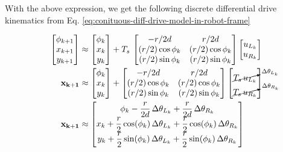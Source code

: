 \documentclass[12pt]{article}
\begin{document}
With the above expression, we get the following discrete differential drive kinematics from Eq. \ref{eq:conituous-diff-drive-model-in-robot-frame}

\renewcommand{\arraystretch}{1.5}
\begin{equation}
\begin{aligned}
    \begin{bmatrix}
        \phi_{k+1} \\ x_{k+1} \\ y_{k+1}
    \end{bmatrix} &\approx 
    \begin{bmatrix}
        \phi_k \\ x_k \\ y_k
    \end{bmatrix} + 
    T_s \, \begin{bmatrix}
        -r/2d & r/2d \\
        (r/2)\cos\phi_k & (r/2)\cos\phi_k \\
        (r/2)\sin\phi_k & (r/2)\sin\phi_k
    \end{bmatrix}  
    \begin{bmatrix} u_{L_k} \\ u_{R_k} \end{bmatrix} \\
    \mathbf{x_{k+1}} &\approx 
    \begin{bmatrix}
        \phi_k \\ x_k \\ y_k
    \end{bmatrix} + 
    \begin{bmatrix}
        -r/2d & r/2d \\
        (r/2)\cos\phi_k & (r/2)\cos\phi_k \\
        (r/2)\sin\phi_k & (r/2)\sin\phi_k
    \end{bmatrix}  
    \begin{bmatrix} \cancelto{\Delta\theta_{L_k}}{T_s\,u_{L_k}} \\ \cancelto{\Delta\theta_{R_k}}{T_s\,u_{R_k}} \end{bmatrix} \\
    \mathbf{x_{k+1}} &\approx
    \begin{bmatrix}
        \phi_k - \dfrac{r}{2d}\,\Delta\theta_{L_k} + \dfrac{r}{2d}\,\Delta\theta_{R_k} \\
        x_k + \dfrac{r}{2} \cos(\phi_k) \, \Delta\theta_{L_k} + \dfrac{r}{2} \cos(\phi_k) \, \Delta\theta_{R_k} \\
        y_k + \dfrac{r}{2} \sin(\phi_k) \, \Delta\theta_{L_k} + \dfrac{r}{2} \sin(\phi_k) \, \Delta\theta_{R_k} \\
    \end{bmatrix}
\end{aligned}
\end{equation}
\renewcommand{\arraystretch}{1}
\end{document}
